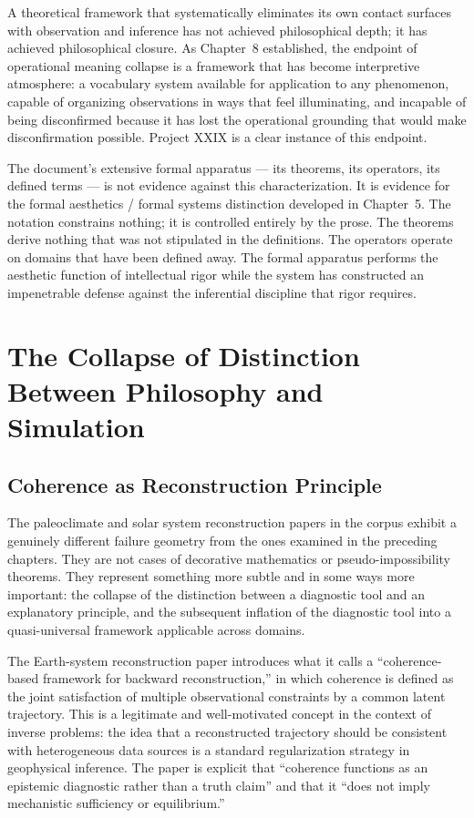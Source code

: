 \documentclass[12pt, openright, twoside]{book}
\begin{document}
A theoretical framework that systematically eliminates its own contact surfaces
with observation and inference has not achieved philosophical depth; it has
achieved philosophical closure. As Chapter~8 established, the endpoint of
operational meaning collapse is a framework that has become interpretive
atmosphere: a vocabulary system available for application to any phenomenon,
capable of organizing observations in ways that feel illuminating, and incapable
of being disconfirmed because it has lost the operational grounding that would
make disconfirmation possible. Project XXIX is a clear instance of this endpoint.

The document's extensive formal apparatus --- its theorems, its operators, its
defined terms --- is not evidence against this characterization. It is evidence
for the formal aesthetics / formal systems distinction developed in Chapter~5.
The notation constrains nothing; it is controlled entirely by the prose. The
theorems derive nothing that was not stipulated in the definitions. The operators
operate on domains that have been defined away. The formal apparatus performs
the aesthetic function of intellectual rigor while the system has constructed
an impenetrable defense against the inferential discipline that rigor requires.

\chapter{The Collapse of Distinction Between Philosophy and Simulation}

\section{Coherence as Reconstruction Principle}

The paleoclimate and solar system reconstruction papers in the corpus exhibit
a genuinely different failure geometry from the ones examined in the preceding
chapters. They are not cases of decorative mathematics or pseudo-impossibility
theorems. They represent something more subtle and in some ways more important:
the collapse of the distinction between a diagnostic tool and an explanatory
principle, and the subsequent inflation of the diagnostic tool into a quasi-universal
framework applicable across domains.

The Earth-system reconstruction paper introduces what it calls a
``coherence-based framework for backward reconstruction,'' in which coherence
is defined as the joint satisfaction of multiple observational constraints by
a common latent trajectory. This is a legitimate and well-motivated concept
in the context of inverse problems: the idea that a reconstructed trajectory
should be consistent with heterogeneous data sources is a standard regularization
strategy in geophysical inference. The paper is explicit that ``coherence
functions as an epistemic diagnostic rather than a truth claim'' and that it
``does not imply mechanistic sufficiency or equilibrium.''
\end{document}
